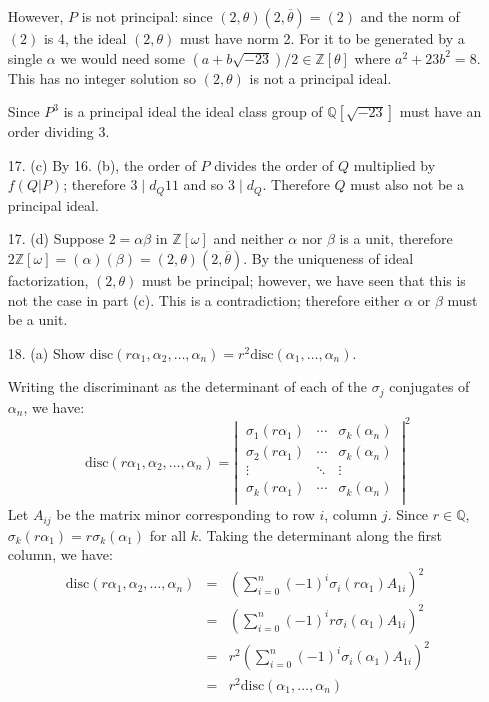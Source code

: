 \documentclass{article}
\newcommand{\w}[0]{\omega}
\newcommand{\Q}[0]{\mathbb{Q}}
\newcommand{\Z}[0]{\mathbb{Z}}
\newcommand{\disc}[1]{\text{disc}(#1)}
\begin{document}
\begin{enumerate}
However, $P$ is not principal: since $(2, \theta)(2, \overline{\theta}) = (2)$ and the norm of $(2)$ is 4, the ideal $(2, \theta)$ must have norm 2.  For it to be generated by a single $\alpha$ we would need some $(a + b\sqrt{-23})/2 \in \Z[\theta]$ where $a^2 + 23b^2 = 8$.  This has no integer solution so $(2, \theta)$ is not a principal ideal.

Since $P^3$ is a principal ideal the ideal class group of $\Q[\sqrt{-23}]$ must have an order dividing 3.

\item[17. (c)] By 16. (b), the order of $P$ divides the order of $Q$ multiplied by $f(Q|P)$; therefore $3 \mid d_{Q} 11$ and so $3 \mid d_{Q}$.  Therefore $Q$ must also not be a principal ideal.

\item[17. (d)] Suppose $2 = \alpha \beta$ in $\Z[\w]$ and neither $\alpha$ nor $\beta$ is a unit, therefore $2\Z[\w] = (\alpha)(\beta) = (2, \theta)(2, \overline{\theta})$.  By the uniqueness of ideal factorization, $(2, \theta)$ must be principal; however, we have seen that this is not the case in part (c).  This is a contradiction; therefore either $\alpha$ or $\beta$ must be a unit.

\item [18. (a)]  Show $\disc{r\alpha_1, \alpha_2, \ldots, \alpha_n} = r^2 \disc{\alpha_1, \ldots, \alpha_n}$.

Writing the discriminant as the determinant of each of the $\sigma_j$ conjugates of $\alpha_n$, we have:
\[ \disc{r\alpha_1, \alpha_2, \ldots, \alpha_n} = \left|\ \begin{matrix}
    \sigma_1(r\alpha_1) & \cdots & \sigma_k(\alpha_n)
    \\
    \sigma_2(r\alpha_1) & \cdots & \sigma_k(\alpha_n)
    \\
    \vdots & \ddots & \vdots \\
    \sigma_k(r\alpha_1) & \cdots & \sigma_k(\alpha_n) \\
\end{matrix}\ \right|^2 \]
Let $A_{ij}$ be the matrix minor corresponding to row $i$, column $j$.  Since $r \in \Q$, $\sigma_k(r\alpha_1) = r\sigma_k(\alpha_1)$ for all $k$.  Taking the determinant along the first column, we have:
\begin{eqnarray*}
    \disc{r\alpha_1, \alpha_2, \ldots, \alpha_n} &=& \left(\sum_{i = 0}^{n} (-1)^i \sigma_i(r\alpha_1) A_{1i}\right)^2\\
    &=& \left(\sum_{i = 0}^{n} (-1)^i r\sigma_i(\alpha_1) A_{1i}\right)^2\\
    &=& r^2 \left(\sum_{i = 0}^{n} (-1)^i \sigma_i(\alpha_1) A_{1i}\right)^2\\
    &=& r^2 \disc{\alpha_1, \ldots, \alpha_n}
\end{eqnarray*}


\end{enumerate}
\end{document}

